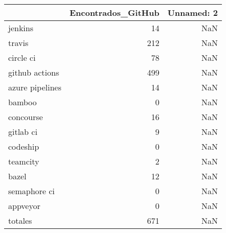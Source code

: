 \begin{tabular}{lrr}
\toprule
{} &  Encontrados\_GitHub &  Unnamed: 2 \\
\midrule
jenkins         &                  14 &         NaN \\
travis          &                 212 &         NaN \\
circle ci       &                  78 &         NaN \\
github actions  &                 499 &         NaN \\
azure pipelines &                  14 &         NaN \\
bamboo          &                   0 &         NaN \\
concourse       &                  16 &         NaN \\
gitlab ci       &                   9 &         NaN \\
codeship        &                   0 &         NaN \\
teamcity        &                   2 &         NaN \\
bazel           &                  12 &         NaN \\
semaphore ci    &                   0 &         NaN \\
appveyor        &                   0 &         NaN \\
totales         &                 671 &         NaN \\
\bottomrule
\end{tabular}
